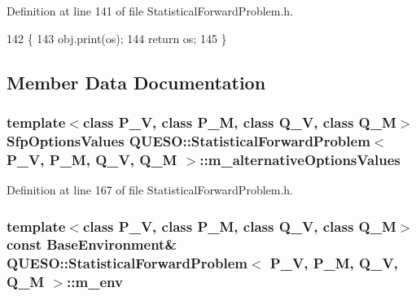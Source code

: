 Definition at line 141 of file Statistical\-Forward\-Problem.\-h.


\begin{DoxyCode}
142                                                              \{
143     obj.print(os);
144     \textcolor{keywordflow}{return} os;
145   \}
\end{DoxyCode}


\subsection{Member Data Documentation}
\hypertarget{class_q_u_e_s_o_1_1_statistical_forward_problem_a8c76cf6924787705afbd66a70954bf6a}{
\subsubsection[{m\-\_\-alternative\-Options\-Values}]{\setlength{\rightskip}{0pt plus 5cm}template$<$class P\-\_\-\-V, class P\-\_\-\-M, class Q\-\_\-\-V, class Q\-\_\-\-M$>$ {\bf Sfp\-Options\-Values} {\bf Q\-U\-E\-S\-O\-::\-Statistical\-Forward\-Problem}$<$ P\-\_\-\-V, P\-\_\-\-M, Q\-\_\-\-V, Q\-\_\-\-M $>$\-::m\-\_\-alternative\-Options\-Values\hspace{0.3cm}{\ttfamily [private]}}}\label{class_q_u_e_s_o_1_1_statistical_forward_problem_a8c76cf6924787705afbd66a70954bf6a}


Definition at line 167 of file Statistical\-Forward\-Problem.\-h.

\hypertarget{class_q_u_e_s_o_1_1_statistical_forward_problem_ab8dc530366735e9ca11290e37f95996a}{
\subsubsection[{m\-\_\-env}]{\setlength{\rightskip}{0pt plus 5cm}template$<$class P\-\_\-\-V, class P\-\_\-\-M, class Q\-\_\-\-V, class Q\-\_\-\-M$>$ const {\bf Base\-Environment}\& {\bf Q\-U\-E\-S\-O\-::\-Statistical\-Forward\-Problem}$<$ P\-\_\-\-V, P\-\_\-\-M, Q\-\_\-\-V, Q\-\_\-\-M $>$\-::m\-\_\-env\hspace{0.3cm}{\ttfamily [private]}}}\label{class_q_u_e_s_o_1_1_statistical_forward_problem_ab8dc530366735e9ca11290e37f95996a}


